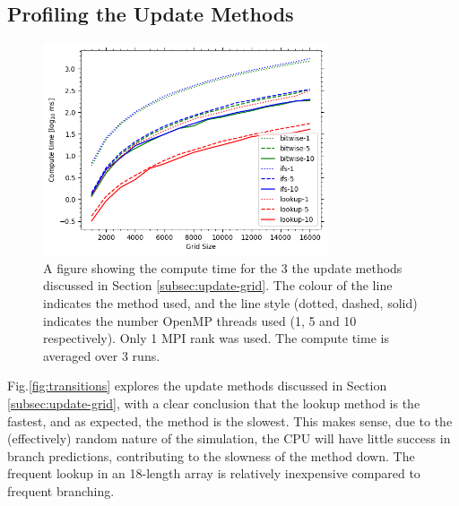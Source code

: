    \subsection{Profiling the Update Methods}\label{subsec:prof-trans}
        \begin{figure}[htb]
    \centering
    \includegraphics[width=0.75\textwidth]{./figures/transitions}
    \caption{A figure showing the compute time for the 3 the update methods discussed in Section \eqref{subsec:update-grid}.
        The colour of the line indicates the method used, and the line style (dotted, dashed, solid) indicates the number
        OpenMP threads used (1, 5 and 10 respectively).
        Only 1 MPI rank was used.
        The compute time is averaged over 3 runs.}
    \label{fig:transitions}
    \end{figure}

    Fig.\eqref{fig:transitions} explores the update methods discussed in Section \eqref{subsec:update-grid}, with a
    clear conclusion that the lookup method is the fastest, and as expected, the  method is the slowest.
    This makes sense, due to the (effectively) random nature of the simulation, the CPU will have little success
    in branch predictions, contributing to the slowness of the  method down.
    The frequent lookup in an 18-length array is relatively inexpensive compared to frequent branching.




